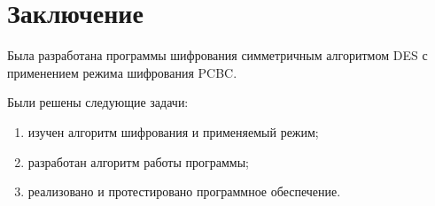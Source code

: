 \section*{Заключение}

Была разработана программы шифрования симметричным алгоритмом
DES с применением режима шифрования PCBC.

Были решены следующие задачи:
\begin{enumerate}
    \item изучен алгоритм шифрования и применяемый режим;
    \item разработан алгоритм работы программы;
    \item реализовано и протестировано программное обеспечение.
\end{enumerate}

